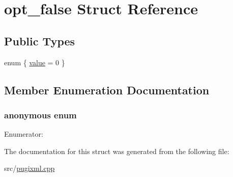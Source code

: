 \hypertarget{structopt__false}{
\section{opt\_\-false Struct Reference}
\label{structopt__false}
}
\subsection*{Public Types}
\begin{DoxyCompactItemize}
\item 
enum \{ \hyperlink{structopt__false_adf1eb3ad7c3e284bd861d80d6817174fa0608b30b4b0f63ec3263f29fe847899e}{value} =  0
 \}
\end{DoxyCompactItemize}


\subsection{Member Enumeration Documentation}
\hypertarget{structopt__false_adf1eb3ad7c3e284bd861d80d6817174f}{
\subsubsection[{"@0}]{\setlength{\rightskip}{0pt plus 5cm}anonymous enum}}
\label{structopt__false_adf1eb3ad7c3e284bd861d80d6817174f}
\begin{Desc}
\item[Enumerator: ]\par
\begin{description}
\item[{\em 
\hypertarget{structopt__false_adf1eb3ad7c3e284bd861d80d6817174fa0608b30b4b0f63ec3263f29fe847899e}{
value}
\label{structopt__false_adf1eb3ad7c3e284bd861d80d6817174fa0608b30b4b0f63ec3263f29fe847899e}
}]\end{description}
\end{Desc}



The documentation for this struct was generated from the following file:\begin{DoxyCompactItemize}
\item 
src/\hyperlink{pugixml_8cpp}{pugixml.cpp}\end{DoxyCompactItemize}

